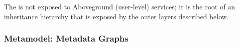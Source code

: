 \documentclass{sig-alternate}
\begin{document}

The \core is not exposed to Aboveground (user-level) services; it is the root of an inheritance hierarchy that is exposed by the outer layers described below.  

\subsubsection{\Mantle Metamodel: Metadata Graphs}



\end{document}
